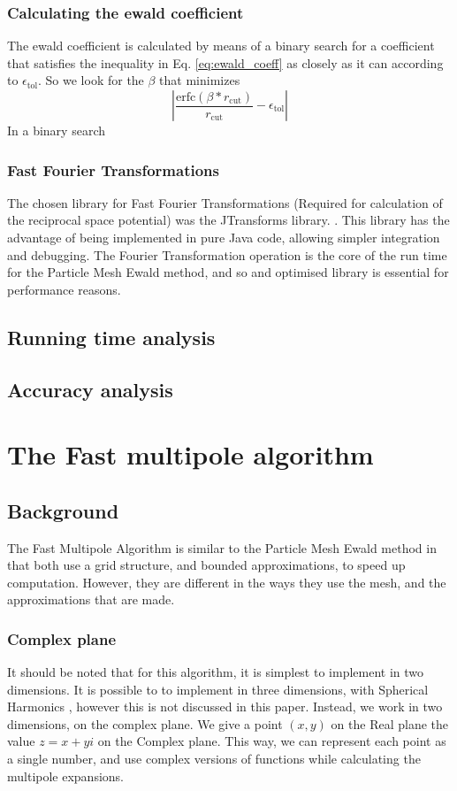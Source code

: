 \documentclass[pdftex,twoside,a4paper]{report}
\newcommand{\pmem}{Particle Mesh Ewald method}
\newcommand{\fma}{Fast Multipole Algorithm}
\begin{document}
\subsubsection{Calculating the ewald coefficient}
The ewald coefficient is calculated by means of a binary search for a coefficient that satisfies the inequality in Eq. \ref{eq:ewald_coeff} as closely as it can according to $\epsilon_{\text{tol}}$. So we look for the $\beta$ that minimizes
\[
\left| \frac{\text{erfc}(\beta * r_{\text{cut}})}{r_\text{cut}} - \epsilon_\text{tol} \right| 
\]
In a binary search
\subsubsection{Fast Fourier Transformations}
The chosen library for Fast Fourier Transformations (Required for calculation of the reciprocal space potential) was the JTransforms library. \cite{JTransform}. This library has the advantage of being implemented in pure Java code, allowing simpler integration and debugging. The Fourier Transformation operation is the core of the run time for the \pmem{}, and so and optimised library is essential for performance reasons.
\subsection{Running time analysis}
\subsection{Accuracy analysis}
\label{sec:optimisations}
\section{The Fast multipole algorithm}
\subsection{Background}
The \fma{} is similar to the \pmem{} in that both use a grid structure, and bounded approximations, to speed up computation. However, they are different in the ways they use the mesh, and the approximations that are made.
\subsubsection{Complex plane}
It should be noted that for this algorithm, it is simplest to implement in two dimensions. It is possible to to implement in three dimensions, with Spherical Harmonics \cite{Ihler04}, however this is not discussed in this paper. Instead, we work in two dimensions, on the complex plane. We give a point $(x,y)$ on the Real plane the value $z = x + yi$ on the Complex plane. This way, we can represent each point as a single number, and use complex versions of functions while calculating the multipole expansions.
\end{document}
